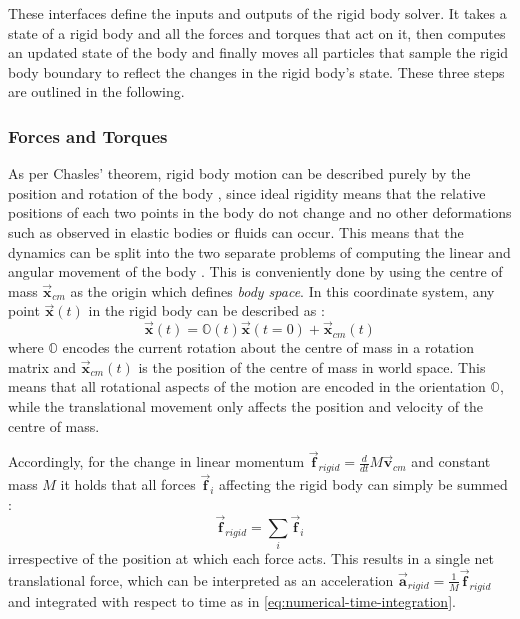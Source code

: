 \documentclass[oneside, a4paper]{book}
\newcommand\vek[1]{\vec{\bm{#1}}}
\begin{document}
    These interfaces define the inputs and outputs of the rigid body solver. It takes a state of a rigid body and all the forces and torques that act on it, then computes an updated state of the body and finally moves all particles that sample the rigid body boundary to reflect the changes in the rigid body's state.
    These three steps are outlined in the following.

    \subsubsection{Forces and Torques}
    As per Chasles' theorem, rigid body motion can be described purely by the position and rotation of the body \autocite{classical-mechanics}, since ideal rigidity means that the relative positions of each two points in the body do not change and no other deformations such as observed in elastic bodies or fluids can occur. This means that the dynamics can be split into the two separate problems of computing the linear and angular movement of the body \autocite{classical-mechanics}. This is conveniently done by using the centre of mass $\vek{x}_{cm}$ as the origin which defines \textit{body space}. In this coordinate system, any point $\vek{x}(t)$ in the rigid body can be described as \autocite{physically-based-rigids}:
    \begin{equation}
      \vek{x}(t) = \mathds{O}(t)\vek{x}(t=0) + \vek{x}_{cm}(t)
    \end{equation}
    where $\mathds{O}$ encodes the current rotation about the centre of mass in a rotation matrix and $\vek{x}_{cm}(t)$ is the position of the centre of mass in world space. This means that all rotational aspects of the motion are encoded in the orientation $\mathds{O}$, while the translational movement only affects the position and velocity of the centre of mass. 
    
    Accordingly, for the change in linear momentum $\vek{f}_{rigid} = \frac{d}{dt} M\vek{v}_{cm}$ and constant mass $M$ it holds that all forces $\vek{f}_i$ affecting the rigid body can simply be summed \autocite{physically-based-rigids}:
    \begin{equation}
      \vek{f}_{rigid} = \sum_i \vek{f}_i
    \end{equation}
    irrespective of the position at which each force acts. This results in a single net translational force, which can be interpreted as an acceleration $\vek{a}_{rigid} = \frac{1}{M}\vek{f}_{rigid}$ and integrated with respect to time as in \autoref{eq:numerical-time-integration}.
\end{document}
